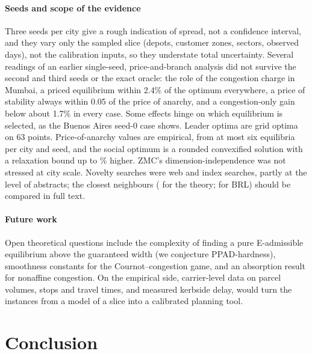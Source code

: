 \documentclass[preprint,12pt]{elsarticle}
\theoremstyle{definition}
\theoremstyle{remark}
\begin{document}
\paragraph{Seeds and scope of the evidence} Three seeds per city give a rough indication of spread, not a confidence interval, and they vary only the sampled slice (depots, customer zones, sectors, observed days), not the calibration inputs, so they understate total uncertainty. Several readings of an earlier single-seed, price-and-branch analysis did not survive the second and third seeds or the exact oracle: the role of the congestion charge in Mumbai, a priced equilibrium within 2.4\% of the optimum everywhere, a price of stability always within 0.05 of the price of anarchy, and a congestion-only gain below about 1.7\% in every case. Some effects hinge on which equilibrium is selected, as the Buenos Aires seed-0 case shows. Leader optima are grid optima on 63 points. Price-of-anarchy values are empirical, from at most six equilibria per city and seed, and the social optimum is a rounded convexified solution with a relaxation bound up to \SObound\% higher. ZMC's dimension-independence was not stressed at city scale. Novelty searches were web and index searches, partly at the level of abstracts; the closest neighbours (\citealp{Liu2023,Beauchene2016,Feik2026} for the theory; \citealp{GhosalHoWiesemann2024} for BRL) should be compared in full text.

\paragraph{Future work} Open theoretical questions include the complexity of finding a pure E-admissible equilibrium above the guaranteed width (we conjecture PPAD-hardness), smoothness constants for the Cournot--congestion game, and an absorption result for nonaffine congestion. On the empirical side, carrier-level data on parcel volumes, stops and travel times, and measured kerbside delay, would turn the instances from a model of a slice into a calibrated planning tool.

\section{Conclusion}\label{sec:conclusion}
\end{document}
